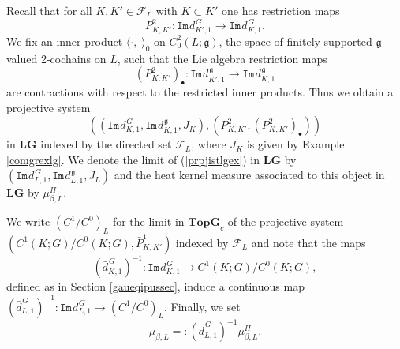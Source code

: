 \documentclass[11pt,reqno]{amsart}
\numberwithin{equation}{section}
\theoremstyle{remark}
\theoremstyle{rmdefinition}
\begin{document}
Recall that for all $K, K' \in \mathcal{F}_{L}$ with $K\subset K'$ one has restriction maps
$$ P^2_{K,K'}: \mathtt{Im}\hspace{1pt}d_{K',1}^{\hspace{1pt}G} \to \mathtt{Im}\hspace{1pt}d_{K,1}^{\hspace{1pt}G}.$$
We fix an inner product $\langle \cdot , \cdot\rangle_0$ on $C^{2}_0(L;\mathfrak g)$, the space of finitely supported $\mathfrak g$-valued 2-cochains on $L$, such that the Lie algebra restriction maps
$$ (P^2_{K,K'})_{\bullet}: \mathtt{Im}\hspace{1pt}d_{K',1}^{\hspace{1pt}\mathfrak g} \to \mathtt{Im}\hspace{1pt}d_{K,1}^{\hspace{1pt}\mathfrak g} $$
are contractions with respect to the restricted inner products. Thus we obtain a projective system
\begin{equation}\label{prpjistlgex}
	((\mathtt{Im}\hspace{1pt}d_{K,1}^{\hspace{1pt}G},\mathtt{Im}\hspace{1pt}d_{K,1}^{\hspace{1pt}\mathfrak g},J_K),( P^2_{K,K'},(P^2_{K,K'})_{\bullet}))
\end{equation}
in $\mathbf{LG}$ indexed by the directed set $\mathcal{F}_{L}$, where $J_K$ is given by Example \ref{comgrexlg}. We denote the limit of (\ref{prpjistlgex}) in $\mathbf{LG}$ by $(\mathtt{Im}\hspace{1pt}d_{L,1}^{\hspace{1pt}G},
\mathtt{Im}\hspace{1pt}d_{L,1}^{\hspace{1pt}\mathfrak g},J_L)$ and the heat kernel measure associated to this object in $\mathbf{LG}$ by $\mu^{H}_{\beta,L}$.

We write $(C^1/C^0)_L$ for the limit in $\mathbf{TopG}_c$  of the projective system $(C^1(K;G)/C^0(K;G),\bar{P}^1_{K,K'})$ indexed by $\mathcal{F}_{L}$ and note that the maps 
 $$(\bar{d}^{\hspace{1pt}G}_{K,1})^{-1}: \mathtt{Im}\hspace{1pt}d_{K,1}^{\hspace{1pt}G} \to C^1(K;G)/C^0(K;G),$$
defined as in Section \ref{gaueqipussec}, induce a continuous map $(\bar{d}^{\hspace{1pt}G}_{L,1})^{-1}: \mathtt{Im}\hspace{1pt}d_{L,1}^{\hspace{1pt}G} \to (C^1/C^0)_L$. Finally, we set 
\begin{equation}\label{meuinterldefi}
\mu_{\beta, L}=: (\bar{d}^{\hspace{1pt}G}_{L,1})^{-1}\mu^{H}_{\beta,L}.
\end{equation}
\end{document}
